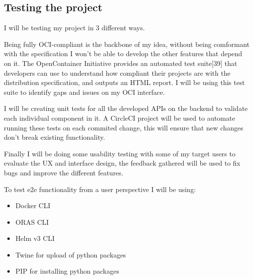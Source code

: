 \documentclass{article}
\begin{document}
  \subsection{Testing the project}

  I will be testing my project in 3 different ways.

  Being fully OCI-compliant is the backbone of my idea, without being comformant with the specification I won't be able to develop the other features that depend on it. The OpenContainer Initiative provides an automated test suite[39] that developers can use to understand how compliant their projects are with the distribution specification, and outputs an HTML report. I will be using this test suite to identify gaps and issues on my OCI interface.

  I will be creating unit tests for all the developed APIs on the backend to validate each individual component in it. A CircleCI project will be used to automate running these tests on each commited change, this will ensure that new changes don't break existing functionality.

  Finally I will be doing some usability testing with some of my target users to evaluate the UX and interface design, the feedback gathered will be used to fix bugs and improve the different features.

  To test e2e functionality from a user perspective I will be using:

  \begin{itemize}
    \item Docker CLI
    \item ORAS CLI
    \item Helm v3 CLI
    \item Twine for upload of python packages
    \item PIP for installing python packages
  \end{itemize}
  
\end{document}
